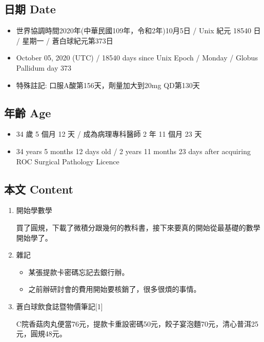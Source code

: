 \documentclass[a5paper, 11pt
]{book}
\providecommand{\tightlist}{%
  \setlength{\itemsep}{0pt}\setlength{\parskip}{0pt}}
\begin{document}
\hypertarget{ux65e5ux671f-date-32}{%
\subsection{日期 Date}\label{ux65e5ux671f-date-32}}

\begin{itemize}
\tightlist
\item
  世界協調時間2020年(中華民國109年，令和2年)10月5日 / Unix 紀元 18540 日
  / 星期一 / 蒼白球紀元第373日
\item
  October 05, 2020 (UTC) / 18540 days since Unix Epoch / Monday / Globus
  Pallidum day 373
\item
  特殊註記: 口服A酸第156天，劑量加大到20mg QD第130天
\end{itemize}

\hypertarget{ux5e74ux9f61-age-32}{%
\subsection{年齡 Age}\label{ux5e74ux9f61-age-32}}

\begin{itemize}
\tightlist
\item
  34 歲 5 個月 12 天 / 成為病理專科醫師 2 年 11 個月 23 天
\item
  34 years 5 months 12 days old / 2 years 11 months 23 days after
  acquiring ROC Surgical Pathology Licence
\end{itemize}

\hypertarget{ux672cux6587-content-32}{%
\subsection{本文 Content}\label{ux672cux6587-content-32}}

\begin{enumerate}
\def\labelenumi{\arabic{enumi}.}
\item
  開始學數學

  買了圓規，下載了微積分跟幾何的教科書，接下來要真的開始從最基礎的數學開始學了。
\item
  雜記

  \begin{itemize}
  \tightlist
  \item
    某張提款卡密碼忘記去銀行辦。
  \item
    之前辦研討會的費用開始要核銷了，很多很煩的事情。
  \end{itemize}
\item
  蒼白球飲食誌暨物價筆記{[}1{]}

  C院香菇肉丸便當76元，提款卡重設密碼50元，餃子宴泡麵70元，清心普洱25元，圓規48元。
\end{enumerate}
\end{document}

